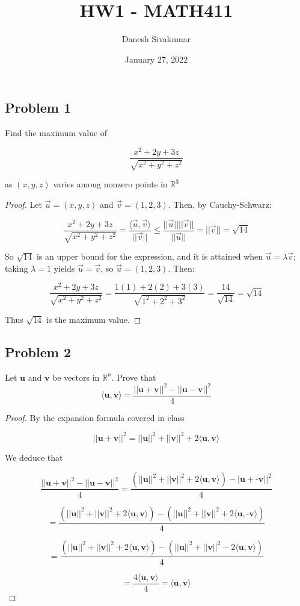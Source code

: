 \documentclass{article}
\title{HW1 - MATH411}
\author{Danesh Sivakumar}
\date{January 27, 2022}
\begin{document}
\maketitle 


\subsection*{Problem 1}

Find the maximum value of 

\[\frac{x^2+2y+3z}{\sqrt{x^2+y^2+z^2}}\]

as $(x, y, z)$ varies among nonzero points in $\mathbb{R}^3$

\begin{proof}

Let $\vec{u} = (x, y, z)$ and $\vec{v} = (1, 2, 3)$. Then, by Cauchy-Schwarz:

\[\frac{x^2+2y+3z}{\sqrt{x^2+y^2+z^2}} = \frac{\langle \vec{u},\vec{v}\rangle}{||\vec{v}||} \leq \frac{||\vec{u}|| ||\vec{v}||}{||\vec{u}||} = ||\vec{v}|| = \sqrt{14}\]

So $\sqrt{14}$ is an upper bound for the expression, and it is attained when $\vec{u} = \lambda \vec{v}$; taking $\lambda = 1$ yields $\vec{u} = \vec{v}$, so $\vec{u} = (1, 2, 3)$. Then:

\[ \frac{x^2+2y+3z}{\sqrt{x^2+y^2+z^2}} = \frac{1(1)+2(2)+3(3)}{\sqrt{1^2+2^2+3^2}} = \frac{14}{\sqrt{14}} = \sqrt{14}\]

Thus $\sqrt{14}$ is the maximum value.


\end{proof}


\subsection*{Problem 2}
Let $\textbf{u}$ and $\textbf{v}$ be vectors in $\mathbb{R}^n$. Prove that
\[ \langle \textbf{u}, \textbf{v} \rangle = \frac{||\textbf{u} + \textbf{v}||^2 - ||\textbf{u} - \textbf{v}||^2}{4}\]
\begin{proof}

By the expansion formula covered in class

\[ ||\textbf{u} + \textbf{v}||^2 = ||\textbf{u}||^2 + ||\textbf{v}||^2 + 2\langle \textbf{u}, \textbf{v} \rangle \]

We deduce that

\[\frac{||\textbf{u} + \textbf{v}||^2 - ||\textbf{u} - \textbf{v}||^2}{4} = \frac{(||\textbf{u}||^2 + ||\textbf{v}||^2 + 2\langle \textbf{u}, \textbf{v} \rangle) - |\textbf{u} + \textbf{-v}||^2 }{4}\]

\[ = \frac{(||\textbf{u}||^2 + ||\textbf{v}||^2 + 2\langle \textbf{u}, \textbf{v} \rangle) - (||\textbf{u}||^2 + ||\textbf{v}||^2 + 2\langle \textbf{u}, \textbf{-v} \rangle)}{4}\]

\[ = \frac{(||\textbf{u}||^2 + ||\textbf{v}||^2 + 2\langle \textbf{u}, \textbf{v} \rangle) - (||\textbf{u}||^2 + ||\textbf{v}||^2 - 2\langle \textbf{u}, \textbf{v} \rangle)}{4}\]

\[ = \frac{4\langle \textbf{u}, \textbf{v} \rangle}{4} = \langle \textbf{u}, \textbf{v} \rangle \]

\end{proof}
\end{document}
